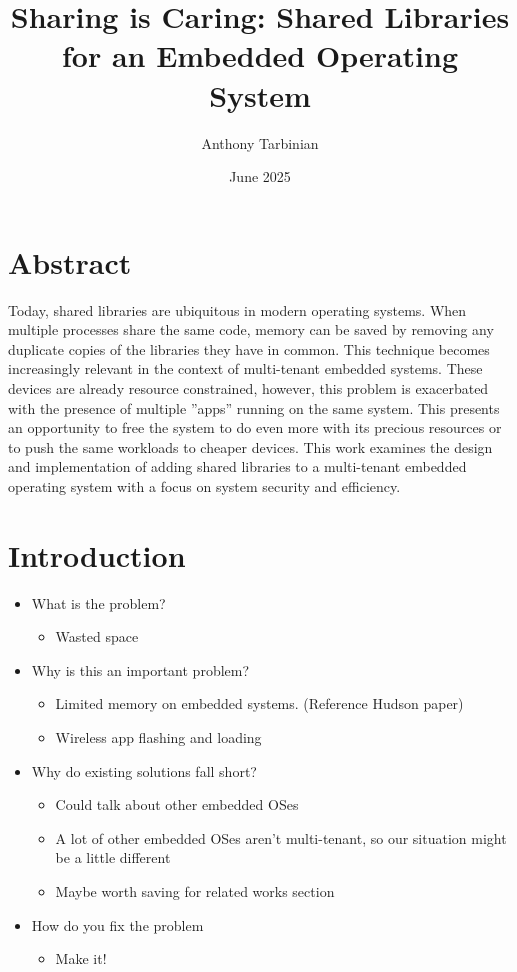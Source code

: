 \documentclass{article}
\title{Sharing is Caring: Shared Libraries for an Embedded Operating System}
\author{Anthony Tarbinian}
\date{June 2025}
\begin{document}
\maketitle

\section*{Abstract}

Today, shared libraries are ubiquitous in modern operating systems. %
When multiple processes share the same code, memory can be saved by removing any duplicate copies of the libraries they have in common. %
This technique becomes increasingly relevant in the context of multi-tenant embedded systems. %
These devices are already resource constrained, however, this problem is exacerbated with the presence of multiple ”apps” running on the same system. %
This presents an opportunity to free the system to do even more with its precious resources or to push the same workloads to cheaper devices. %
This work examines the design and implementation of adding shared libraries to a multi-tenant embedded operating system with a focus on system security and efficiency. %

\section*{Introduction}

\begin{itemize}
    \item What is the problem?
        \begin{itemize}
            \item Wasted space
        \end{itemize}
    \item Why is this an important problem?
        \begin{itemize}
            \item Limited memory on embedded systems. (Reference Hudson paper)
            \item Wireless app flashing and loading
        \end{itemize}
    \item Why do existing solutions fall short?
        \begin{itemize}
            \item Could talk about other embedded OSes
            \item A lot of other embedded OSes aren't multi-tenant, so our situation might be a little different 
            \item Maybe worth saving for related works section
        \end{itemize}
    \item How do you fix the problem
        \begin{itemize}
            \item Make it!
        \end{itemize}
\end{itemize}
\end{document}

